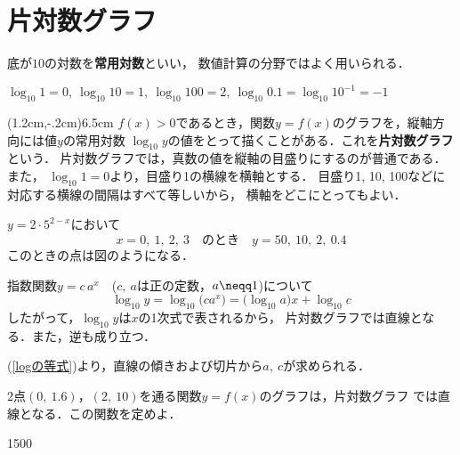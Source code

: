 \documentclass{b5-kaku}
\begin{document}
\setcounter{chapter}{1}

\section*{片対数グラフ}

底が$10$の対数を{\bf 常用対数}といい，
数値計算の分野ではよく用いられる．

\begin{example}
$\log_{10} 1=0,\ \log_{10} 10=1,\ \log_{10}100 =2,\ %
\log_{10}0.1 =\log_{10}10^{-1}=-1$
\end{example}

\begin{mawarikomi}[+1](1.2cm,-.2cm){6.5cm}{}
$f(x)>0$であるとき，関数$y=f(x)$のグラフを，縦軸方向には値$y$の常用対数
$\log_{10}y$の値をとって描くことがある．これを{\bf 片対数グラフ}という．
片対数グラフでは，真数の値を縦軸の目盛りにするのが普通である．また，
$\log_{10} 1=0$より，目盛り1の横線を横軸とする．
目盛り1, 10, 100などに対応する横線の間隔はすべて等しいから，
横軸をどこにとってもよい．
\end{mawarikomi}

\begin{example}
$y=2\cdot 5^{2-x}$において
\[
x=0,\ 1,\ 2,\ 3\quad\text{のとき}\quad y=50,\ 10,\ 2,\ 0.4
\]
このときの点は図のようになる．
\end{example}

指数関数$y=c\,a^x$\ \ ($c,\ a$は正の定数，$a\neqq 1$)について
\begin{equation}\label{logの等式}
\log_{10}y=\log_{10}\bigl(c a^x\bigr)=\bigl(\log_{10}a\bigr)x+\log_{10}c
\end{equation}
したがって，$\log_{10} y$は$x$の1次式で表されるから，
片対数グラフでは直線となる．また，逆も成り立つ．

(\ref{logの等式})より，直線の傾きおよび切片から$a,\ c$が求められる．

\begin{exercise}
2点$(0,\ 1.6)$，$(2,\ 10)$を通る関数$y=f(x)$のグラフは，片対数グラフ
では直線となる．この関数を定めよ．
\end{exercise}

\begin{layer}{150}{0}

\end{layer}
\end{document}
